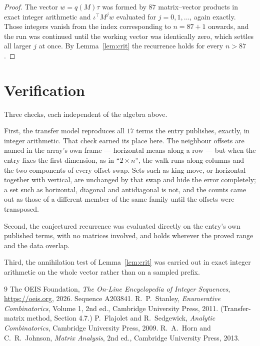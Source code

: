 \documentclass[11pt,a4paper]{article}
\theoremstyle{plain}
\theoremstyle{definition}
\begin{document}
\begin{proof}
The vector $w=q(M)\tau$ was formed by $87$ matrix--vector products in exact integer
arithmetic and $\iota^{\!\top}M^{j}w$ evaluated for $j=0,1,\dots$, again exactly. Those
integers vanish from the index corresponding to $n=87+1$ onwards, and the run was
continued until the working vector was identically zero, which settles all larger $j$ at once.
By Lemma~\ref{lem:crit} the recurrence holds for every $n>87$.
\end{proof}

\section{Verification}

Three checks, each independent of the algebra above.

First, the transfer model reproduces all $17$ terms the entry publishes, exactly, in
integer arithmetic. That check earned its place here. The neighbour offsets are named in the
array's own frame --- horizontal means along a row --- but when the entry fixes the first
dimension, as in ``$2\times n$'', the walk runs along columns and the two components of every
offset swap. Sets such as king-move, or horizontal together with vertical, are unchanged by
that swap and hide the error completely; a set such as horizontal, diagonal and antidiagonal
is not, and the counts came out as those of a different member of the same family until the
offsets were transposed.

Second, the conjectured recurrence was evaluated directly on the entry's own published terms,
with no matrices involved, and holds wherever the proved range and the data overlap.

Third, the annihilation test of Lemma~\ref{lem:crit} was carried out in exact integer
arithmetic on the whole vector rather than on a sampled prefix.

\begin{thebibliography}{9}
 The OEIS Foundation, \emph{The On-Line Encyclopedia of Integer
Sequences}, \url{https://oeis.org}, 2026. Sequence A203841.
 R.~P.~Stanley, \emph{Enumerative Combinatorics}, Volume 1, 2nd ed.,
Cambridge University Press, 2011. (Transfer-matrix method, Section 4.7.)
 P.~Flajolet and R.~Sedgewick, \emph{Analytic Combinatorics}, Cambridge
University Press, 2009.
 R.~A.~Horn and C.~R.~Johnson, \emph{Matrix Analysis}, 2nd ed., Cambridge
University Press, 2013.
\end{thebibliography}
\end{document}
